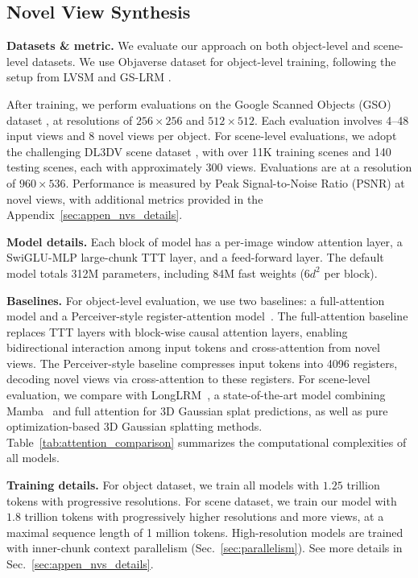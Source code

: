 \documentclass{article}
\begin{document}
\subsection{Novel View Synthesis}\label{sec:exp_nvs}

\noindent\textbf{Datasets \& metric.} We evaluate our approach on 
both object-level and scene-level datasets.
We use Objaverse dataset \cite{deitke2023objaverse} for object-level training, 
following the setup from LVSM \cite{jin2024lvsm} and GS-LRM \cite{zhang2024gs}.  

After training, we perform evaluations on the Google Scanned Objects (GSO) dataset \cite{downs2022google}, at resolutions of $256\times256$ and $512\times512$. Each evaluation involves 4–48 input views and 8 novel views per object.
For scene-level evaluations, we adopt the challenging DL3DV scene dataset \cite{ling2024dl3dv}, with over 11K training scenes and 140 testing scenes, each with approximately 300 views.
Evaluations are at a resolution of $960\times536$.
Performance is measured by Peak Signal-to-Noise Ratio (PSNR) at novel views, with additional metrics provided in the Appendix~\ref{sec:appen_nvs_details}.

\noindent\textbf{Model details.}
Each block of model
has a per-image window attention layer,  a SwiGLU-MLP large-chunk TTT layer, 
and a feed-forward layer. 
The default model totals 312M parameters, including 84M fast weights ($6 d^2$ per block). 

\noindent\textbf{Baselines.}
For object-level evaluation, we use two baselines: a full-attention model and a Perceiver-style register-attention model~\cite{jaegle2021perceiver}. The full-attention baseline replaces TTT layers with block-wise causal attention layers, enabling bidirectional interaction among input tokens and cross-attention from novel views. The Perceiver-style baseline compresses input tokens into 4096 registers, decoding novel views via cross-attention to these registers.
For scene-level evaluation, we compare with LongLRM~\cite{ziwen2024long}, a state-of-the-art model combining Mamba~\cite{gu2023mamba} and full attention for 3D Gaussian splat predictions, as well as pure optimization-based 3D Gaussian splatting methods. Table~\ref{tab:attention_comparison} summarizes the computational complexities of all models.

\noindent\textbf{Training details.}
For object dataset, we train all models with $1.25$ trillion tokens with progressive resolutions.  For scene dataset, we train our model with $1.8$ trillion tokens with progressively higher resolutions and more views, at a maximal sequence length of 1 million tokens.  High-resolution models are trained with inner-chunk context parallelism (Sec.~\ref{sec:parallelism}). See more details in Sec.~\ref{sec:appen_nvs_details}.  
\end{document}
